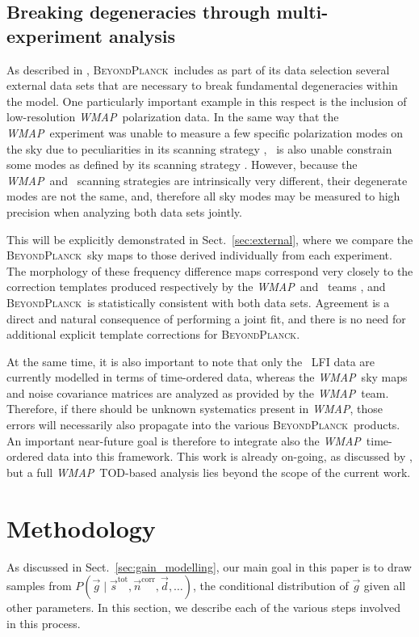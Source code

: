 \documentclass[twocolumn]{aa}
\def\WMAP{\textit{WMAP}}
\renewcommand{\d}[0]{\vec{d}}
\newcommand{\n}[0]{\vec{n}}
\newcommand{\s}[0]{\vec{s}}
\newcommand{\g}[0]{\vec{g}}
\newcommand{\BP}{\textsc{BeyondPlanck}}
\newcommand{\tot}[0]{^{\mathrm{tot}}}
\newcommand{\corr}[0]{^{\mathrm{corr}}}
\begin{document}
\subsection{Breaking degeneracies through multi-experiment analysis}
As described in \citet{bp01}, \BP\ includes as part of its data
selection several external data sets that are necessary to break
fundamental degeneracies within the model. One particularly important
example in this respect is the inclusion of low-resolution
\WMAP\ polarization data. In the same way that the \WMAP\ experiment
was unable to measure a few specific polarization modes on the sky due
to peculiarities in its scanning strategy \citep{jarosik2007},
\Planck\ is also unable constrain some modes as defined by its
scanning strategy \citep{planck2016-l02}. However, because the
\WMAP\ and \Planck\ scanning strategies are intrinsically very
different, their degenerate modes are not the same, and, therefore all
sky modes may be measured to high precision when analyzing both data
sets jointly.

This will be explicitly demonstrated in Sect.~\ref{sec:external},
where we compare the \BP\ sky maps to those derived individually from
each experiment. The morphology of these frequency difference maps
correspond very closely to the correction templates produced
respectively by the \WMAP\ and \Planck\ teams
\citep{jarosik2007,planck2016-l02}, and \BP\ is statistically
consistent with both data sets. Agreement is a direct and natural
consequence of performing a joint fit, and there is no need for
additional explicit template corrections for \BP.


At the same time, it is also important to note that only the
\Planck\ LFI data are currently modelled in terms of time-ordered
data, whereas the \WMAP\ sky maps and noise covariance matrices are
analyzed as provided by the \WMAP\ team. Therefore, if there should be
unknown systematics present in \WMAP, those errors will necessarily
also propagate into the various \BP\ products. An important
near-future goal is therefore to integrate also the
\WMAP\ time-ordered data into this framework. This work is already
on-going, as discussed by \citet{bp17}, but a full \WMAP\ TOD-based
analysis lies beyond the scope of the current work.


\section{Methodology}
\label{sec:methodology}
As discussed in Sect.~\ref{sec:gain_modelling}, our main goal in this
paper is to draw samples from $P(\g\mid\s\tot, \n\corr, \d, \ldots)$, the
conditional distribution of $\g$ given all other parameters. In this
section, we describe each of the various steps involved in this
process.
\end{document}
